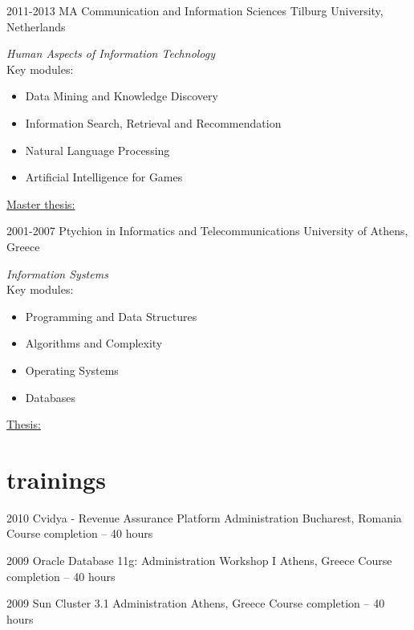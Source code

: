 \documentclass[]{friggeri-cv} %
\begin{document}
\begin{entrylist}


\entry
{2011-2013}
{MA Communication and Information Sciences}
{Tilburg University, Netherlands}
{\emph{Human Aspects of Information Technology} \\ 
Key modules:
\begin{itemize}
\item Data Mining and Knowledge Discovery
\item Information Search, Retrieval and Recommendation
\item Natural Language Processing
\item Artificial Intelligence for Games
\end{itemize}
\underline{Master thesis:}
}


\entry
{2001-2007}
{Ptychion in Informatics and Telecommunications}
{University of Athens, Greece}
{\emph{Information Systems} \\
Key modules:
\begin{itemize}
\item Programming and Data Structures
\item Algorithms and Complexity
\item Operating Systems
\item Databases
\end{itemize}
\underline{Thesis:}
}


\end{entrylist}

\pagebreak
\section{trainings}

\begin{entrylist}


\entry
{2010}
{Cvidya - Revenue Assurance Platform Administration}
{Bucharest, Romania}
{Course completion -- 40 hours}

\entry
{2009}
{Oracle Database 11g: Administration Workshop I}
{Athens, Greece}
{Course completion -- 40 hours}

\entry
{2009}
{Sun Cluster 3.1 Administration}
{Athens, Greece}
{Course completion -- 40 hours}

\end{entrylist}
\end{document}
